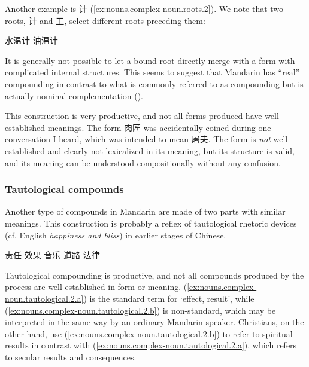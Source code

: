 \documentclass[UTF8, a4paper, oneside, scheme=plain, 12pt]{ctexrep}
\newcommand{\form}[1]{\emph{#1}}
\newcommand{\translate}[1]{`#1'}
\begin{document}
Another example is 计 (\ref{ex:nouns.complex-noun.roots.2}).
We note that two roots, 计 and 工, select different roots preceding them:

\begin{exe}
    \ex\label{ex:nouns.complex-noun.roots.2} \begin{xlist}
        \ex 水温计
        \ex 油温计
    \end{xlist}
\end{exe}

It is generally not possible to let a bound root directly merge with a form with complicated internal structures.
This seems to suggest that Mandarin has ``real'' compounding in contrast to what is commonly referred to as compounding but is actually nominal complementation ().

This construction is very productive, and not all forms produced have well established meanings.
The form 肉匠 was accidentally coined during one conversation I heard,
which was intended to mean 屠夫.
The form is \emph{not} well-established and clearly not lexicalized in its meaning,
but its structure is valid, and its meaning can be understood
compositionally without any confusion.

\subsubsection{Tautological compounds}\label{sec:nouns.complex-noun.the-same}

Another type of compounds in Mandarin are made of two parts with similar meanings.
This construction is probably a reflex of tautological rhetoric devices (cf. English \form{happiness and bliss}) in earlier stages of Chinese.

\begin{exe}
    \ex \begin{xlist}
        \ex 责任
        \ex 效果
        \ex 音乐
        \ex 道路
        \ex 法律
    \end{xlist}
\end{exe}

Tautological compounding is productive,
and not all compounds produced by the process are well established in form or meaning.
(\ref{ex:nouns.complex-noun.tautological.2.a})
is the standard term for \translate{effect, result},
while (\ref{ex:nouns.complex-noun.tautological.2.b}) is non-standard,
which may be interpreted in the same way by an ordinary Mandarin speaker.
Christians, on the other hand, use (\ref{ex:nouns.complex-noun.tautological.2.b})
to refer to spiritual results 
in contrast with (\ref{ex:nouns.complex-noun.tautological.2.a}),
which refers to secular results and consequences.
\end{document}
